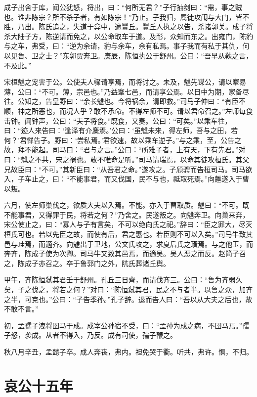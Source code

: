 \documentclass[a4paper,12pt,UTF8,twoside]{ctexbook}
\begin{document}
成子出舍于库，闻公犹怒，将出，曰：“何所无君？”子行抽剑曰：“需，事之贼也。谁非陈宗？所不杀子者，有如陈宗！”乃止。子我归，属徒攻闱与大门，皆不胜，乃出。陈氏追之，失道于弇中，適豐丘。豐丘人执之以告，杀诸郭关。成子将杀大陆子方，陈逆请而免之，以公命取车于道。及耏，众知而东之。出雍门，陈豹与之车，弗受，曰：“逆为余请，豹与余车，余有私焉。事子我而有私于其仇，何以见鲁、卫之士？”东郭贾奔卫。庚辰，陈恒执公于舒州。公曰：“吾早从鞅之言，不及此。”

宋桓魋之宠害于公。公使夫人骤请享焉，而将讨之。未及，魋先谋公，请以鞌易薄，公曰：“不可。薄，宗邑也。”乃益鞌七邑，而请享公焉。以日中为期，家备尽往。公知之，告皇野曰：“余长魋也。今将祸余，请即救。”司马子仲曰：“有臣不顺，神之所恶也，而况人乎？敢不承命。不得左师不可。请以君命召之。”左师每食击钟。闻钟声，公曰：“夫子将食。”既食，又奏。公曰：“可矣。”以乘车往，曰：“迹人来告曰：‘逢泽有介麇焉。’公曰：‘虽魋未来，得左师，吾与之田，若何？’君惮告子。野曰：‘尝私焉。’君欲速，故以乘车逆子。”与之乘，至，公告之故，拜不能起。司马曰：“君与之言。”公曰：“所难子者，上有天，下有先君。”对曰：“魋之不共，宋之祸也。敢不唯命是听。”司马请瑞焉，以命其徒攻桓氏。其父兄故臣曰：“不可。”其新臣曰：“从吾君之命。”遂攻之。子颀骋而告桓司马。司马欲入，子车止之，曰：“不能事君，而又伐国，民不与也，祗取死焉。”向魋遂入于曹以叛。

六月，使左师巢伐之，欲质大夫以入焉。不能。亦入于曹取质。魋曰：“不可。既不能事君，又得罪于民，将若之何？”乃舍之。民遂叛之。向魋奔卫。向巢来奔，宋公使止之，曰：“寡人与子有言矣，不可以绝向氏之祀。”辞曰：“臣之罪大，尽灭桓氏可也。若以先臣之故，而使有后，君之惠也。若臣则不可以入矣。”司马牛致其邑与珪焉，而適齐。向魋出于卫地，公文氏攻之，求夏后氏之璜焉。与之他玉，而奔齐，陈成子使为次卿。司马牛又致其邑焉，而適吴。吴人恶之而反。赵简子召之，陈成子亦召之。卒于鲁郭门之外，阬氏葬诸丘舆。

甲午，齐陈恒弑其君壬于舒州。孔丘三日齊，而请伐齐三。公曰：“鲁为齐弱久矣，子之伐之，将若之何？”对曰：“陈恒弑其君，民之不与者半。以鲁之众，加齐之半，可克也。”公曰：“子告季孙。”孔子辞。退而告人曰：“吾以从大夫之后也，故不敢不言。”

初，孟孺子洩将圉马于成。成宰公孙宿不受，曰：“孟孙为成之病，不圉马焉。”孺子怒，袭成。从者不得入，乃反。成有司使，孺子鞭之。

秋八月辛丑，孟懿子卒。成人奔丧，弗内。袒免哭于衢。听共，弗许。惧，不归。


\chapter{哀公十五年}
\end{document}
